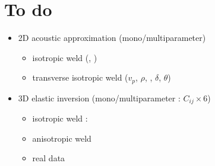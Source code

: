 \documentclass[11pt,xcolor=x11names,compress, notes=show]{beamer}%
\begin{document}
\begin{frame}
\end{frame}

\section{To do}
\begin{frame}{\insertsectionhead}
	\begin{itemize}
		\item 2D acoustic approximation (mono/multiparameter)
		\begin{itemize}
			\item isotropic weld (, )
			\item transverse isotropic weld ($v_{p}$, $\rho$, , $\delta$, $\theta$)
		\end{itemize}
		\item 3D elastic inversion (mono/multiparameter : $C_{ij}\times$6)
		\begin{itemize}
			\item isotropic weld : 
			\item anisotropic weld
			\item real data
		\end{itemize}		
	\end{itemize}
\end{frame}
\end{document}
